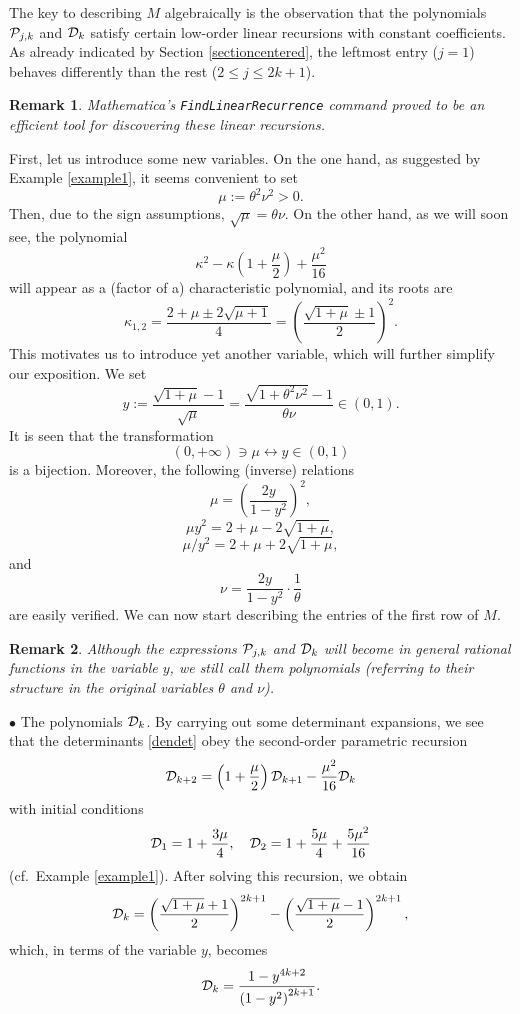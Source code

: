 \documentclass[a4paper]{article}
\newtheorem{remark}{Remark}
\newcommand{\te}{\theta}
\newcommand{\cP}{{\cal{P}}}
\newcommand{\cD}{{\cal{D}}}
\begin{document}
The key to describing $M$ algebraically is the observation that the polynomials $\cP_{j,k}$ and $\cD_{k}$ satisfy certain low-order linear recursions with constant coefficients. As already indicated by Section \ref{sectioncentered}, the leftmost entry ($j=1$) behaves differently than the rest ($2\le j\le 2k+1$).


\begin{remark}
 \textit{Mathematica}'s  {\tt{FindLinearRecurrence}} command proved to be an efficient tool for discovering these linear recursions. 
\end{remark}
First, let us introduce some new variables. On the one hand, as suggested by Example \ref{example1}, it seems convenient to set
\[
\mu:=\te^2\nu^2>0.
\]
Then, due to the sign assumptions, $\sqrt{\mu}=\te\nu$. On the other hand, as we will soon see, the polynomial 
\[
\kappa ^2-\kappa  \left(1+\frac{\mu }{2}\right)+\frac{\mu ^2}{16}
\]
will appear as a (factor of a) characteristic polynomial, and its roots are
\begin{equation}\label{kappa12}
\kappa_{1,2}=\frac{2+\mu \pm 2 \sqrt{\mu +1}}{4}=\left(\frac{\sqrt{1+\mu}\pm 1}{2}\right)^2.
\end{equation}
This motivates us to introduce yet another variable, which will further simplify our exposition. We set
\begin{equation}\label{ydef01}
y:=\frac{\sqrt{1+\mu}-1}{\sqrt{\mu}}=\frac{\sqrt{1+\te^2\nu^2}-1}{\te\nu}\in (0,1).
\end{equation}
It is seen that the transformation
\[
(0,+\infty)\ni\mu \longleftrightarrow y\in(0,1)
\]
is a bijection. Moreover, the following (inverse) relations 
\[
\mu=\left(\frac{2y}{1-y^2}\right)^2,
\]
\[\mu y^2=2+\mu-2\sqrt{1+\mu},\]
\[\mu/y^2=2+\mu+2\sqrt{1+\mu},\]
and
\begin{equation}\label{fromytonu}
\nu=\frac{2y}{1-y^2}\cdot\frac{1}{\te}
\end{equation}
are easily verified. We can now start describing the entries of the first row of $M$.
\begin{remark}
Although the expressions $\cP_{j,k}$ and $\cD_{k}$ will become in general rational functions in the variable $y$, we still call them polynomials (referring to their structure in the original variables $\te$ and $\nu$). 
\end{remark}
$\bullet$ The polynomials $\cD_k$. By carrying out some determinant expansions, we see that the determinants \eqref{dendet} obey the second-order parametric recursion
\begin{equation}\label{Dkrec}
\cD_{k+2}=\left(1+\frac{\mu}{2}\right)\cD_{k+1}-\frac{\mu^2}{16}\cD_k
\end{equation}
with initial conditions
\[
\cD_1=1+\frac{3\mu}{4}, \quad \cD_2=1+\frac{5\mu}{4}+\frac{5\mu^2}{16}
\]
(cf.~Example \ref{example1}). After solving this recursion, we obtain
\[
\cD_k=\left(\frac{\sqrt{1+\mu}+1}{2}\right)^{2 k+1}- \left(\frac{\sqrt{1+\mu}-1}{2}\right)^{2 k+1},
\]
which, in terms of the variable $y$, becomes
\begin{equation}\label{expldet}
\cD_k=\frac{1-y^{4 k+2}}{\left(1-y^2\right)^{2 k+1} }.
\end{equation}
\end{document}
